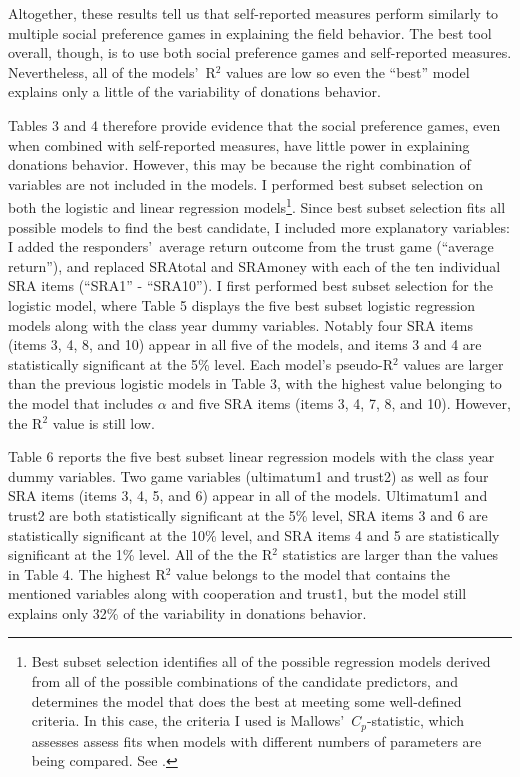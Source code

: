 \documentclass[12pt]{article}
\begin{document}
Altogether, these results tell us that self-reported measures perform similarly to multiple social preference games in explaining the field behavior. The best tool overall, though, is to use both social preference games and self-reported measures. Nevertheless, all of the models\rq \ R$^{2}$ values are low so even the ``best'' model explains only a little of the variability of donations behavior.

Tables 3 and 4 therefore provide evidence that the social preference games, even when combined with self-reported measures, have little power in explaining donations behavior. However, this may be because the right combination of variables are not included in the models. I performed best subset selection on both the logistic and linear regression models\footnote{Best subset selection identifies all of the possible regression models derived from all of the possible combinations of the candidate predictors, and determines the model that does the best at meeting some well-defined criteria. In this case, the criteria I used is Mallows\rq \ \(C_{p}\)-statistic, which assesses assess fits when models with different numbers of parameters are being compared.  See \cite{mallows_1973}.}. Since best subset selection fits all possible models to find the best candidate, I included more explanatory variables: I added the responders\rq \ average return outcome from the trust game (``average return''), and replaced SRAtotal and SRAmoney with each of the ten individual SRA items (``SRA1'' - ``SRA10''). I first performed best subset selection for the logistic model, where Table 5 displays the five best subset logistic regression models along with the class year dummy variables. Notably four SRA items (items 3, 4, 8, and 10) appear in all five of the models, and items 3 and 4 are statistically significant at the 5\% level. Each model\rq s pseudo-R$^{2}$ values are larger than the previous logistic models in Table 3, with the highest value belonging to the model that includes \(\alpha\) and five SRA items (items 3, 4, 7, 8, and 10). However, the R$^{2}$ value is still low.

Table 6 reports the five best subset linear regression models with the class year dummy variables. Two game variables (ultimatum1 and trust2) as well as four SRA items (items 3, 4, 5, and 6) appear in all of the models. Ultimatum1 and trust2 are both statistically significant at the 5\% level, SRA items 3 and 6 are statistically significant at the 10\% level, and SRA items 4 and 5 are statistically significant at the 1\% level. All of the the R$^{2}$ statistics are larger than the values in Table 4. The highest R$^{2}$ value belongs to the model that contains the mentioned variables along with cooperation and trust1, but the model still explains only 32\% of the variability in donations behavior.
\end{document}
